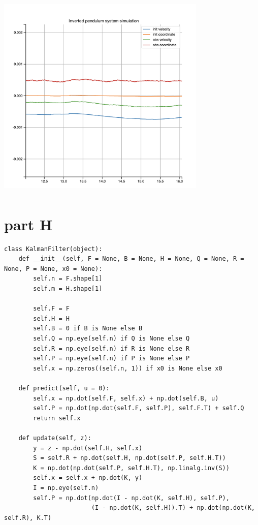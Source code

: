 \documentclass[a4paper,11pt]{article}
\makeatletter
\newcommand{\problemquestion}[1]{\gdef\@problemquestion{#1}}%
\newcommand{\problemsolution}[1]{\gdef\@problemsolution{#1}}%
\theoremstyle{mytheor}
\makeatother
\begin{document}
\includegraphics[width=10cm, height=10cm]{G_2.png}




\section*{part H}
\begin{problem}
  \problemquestion{implement Kalman Filter}
  \problemsolution{Prediction
  $$X^-_k = A_{k-1}X_{k-1}+B_kU_k$$
  $$P^-_k = A_{k-1}P_{k-1}A^T_{k-1}+Q_{k-1}$$
  Update
  $$V_k = Y_k-H_kX^-_k$$
  $$S_k = H_kP^-_kH^T_k+Q_{k-1}$$
  $$K_k = P^-_k H^T_kS^{-1}_k$$
  $$X_k = X^-_k + K_kV_k$$
  $$P_k = P^-_k + K_kS_kK^T_k$$
  }
\end{problem}

\begin{lstlisting}
class KalmanFilter(object):
    def __init__(self, F = None, B = None, H = None, Q = None, R = None, P = None, x0 = None):
        self.n = F.shape[1]
        self.m = H.shape[1]

        self.F = F
        self.H = H
        self.B = 0 if B is None else B
        self.Q = np.eye(self.n) if Q is None else Q
        self.R = np.eye(self.n) if R is None else R
        self.P = np.eye(self.n) if P is None else P
        self.x = np.zeros((self.n, 1)) if x0 is None else x0

    def predict(self, u = 0):
        self.x = np.dot(self.F, self.x) + np.dot(self.B, u)
        self.P = np.dot(np.dot(self.F, self.P), self.F.T) + self.Q
        return self.x

    def update(self, z):
        y = z - np.dot(self.H, self.x)
        S = self.R + np.dot(self.H, np.dot(self.P, self.H.T))
        K = np.dot(np.dot(self.P, self.H.T), np.linalg.inv(S))
        self.x = self.x + np.dot(K, y)
        I = np.eye(self.n)
        self.P = np.dot(np.dot(I - np.dot(K, self.H), self.P),  
                        (I - np.dot(K, self.H)).T) + np.dot(np.dot(K, self.R), K.T)
\end{lstlisting}{}
\end{document}
